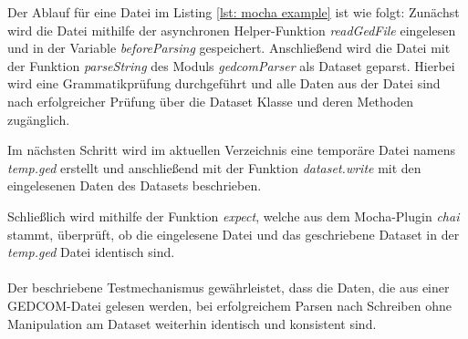 Der Ablauf für eine Datei im Listing \ref{lst: mocha example} ist wie folgt: Zunächst wird die Datei mithilfe der asynchronen Helper-Funktion 
\textit{readGedFile} eingelesen und in der Variable \textit{beforeParsing} gespeichert. Anschließend wird die Datei mit der Funktion 
\textit{parseString} des Moduls \textit{gedcomParser} als Dataset geparst. Hierbei wird eine Grammatikprüfung durchgeführt und alle Daten aus der Datei sind
nach erfolgreicher Prüfung über die Dataset Klasse und deren Methoden zugänglich.

Im nächsten Schritt wird im aktuellen Verzeichnis eine temporäre Datei namens \textit{temp.ged} erstellt und anschließend mit der Funktion 
\textit{dataset.write} mit den eingelesenen Daten des Datasets beschrieben.

Schließlich wird mithilfe der Funktion \textit{expect}, welche aus dem Mocha-Plugin \textit{chai} stammt, überprüft, ob die eingelesene 
Datei und das geschriebene Dataset in der \textit{temp.ged} Datei identisch sind.
\\\\
Der beschriebene Testmechanismus gewährleistet, dass die Daten, die aus einer GEDCOM-Datei gelesen werden, bei erfolgreichem Parsen nach 
Schreiben ohne Manipulation am Dataset weiterhin identisch und konsistent sind.
\\\\

